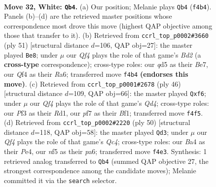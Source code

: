 \documentclass[11pt]{article}
\begin{document}
\clearpage

\begin{figure}[p]\centering
\begin{subfigure}{0.46\textwidth}\centering
\resizebox{\linewidth}{!}{%
\newchessgame
\chessboard[
  setfen={r1b5/ppp2ppk/7p/3qbn2/B4Q2/5P1P/PP4P1/R1B4K w - - 4 32},
  showmover=false,
  pgfstyle=straightmove, color=movearrow, markmove={f4-b4}
]}
\caption{}
\end{subfigure}\hfill
\begin{subfigure}{0.46\textwidth}\centering
\resizebox{\linewidth}{!}{%
\newchessgame
\chessboard[
  setfen={6k1/3bb1p1/r1q2p1p/Bp2p3/1P2N3/2PQ4/1P3PPP/3R2K1 b - - 3 26},
  showmover=false,
  pgfstyle=straightmove, color=movearrow, markmove={d7-e8}
]}
\caption{}
\end{subfigure}
\\[4pt]
\begin{subfigure}{0.46\textwidth}\centering
\resizebox{\linewidth}{!}{%
\newchessgame
\chessboard[
  setfen={r4bk1/1p3pp1/p1p2q1p/P7/1PbQ4/7P/2P2PP1/3R1BK1 w - - 0 24},
  showmover=false,
  pgfstyle=straightmove, color=movearrow, markmove={d4-f6}
]}
\caption{}
\end{subfigure}\hfill
\begin{subfigure}{0.46\textwidth}\centering
\resizebox{\linewidth}{!}{%
\newchessgame
\chessboard[
  setfen={2b2rk1/5p2/pN2pp2/2b1q3/2Q1P3/2P3P1/P4P2/1R3BK1 w - - 1 26},
  showmover=false,
  pgfstyle=straightmove, color=movearrow, markmove={c4-d3}
]}
\caption{}
\end{subfigure}
\caption{\textbf{Move 32, White: \texttt{Qb4}.} (a) Our position; Melanie plays \texttt{Qb4} (\texttt{f4b4}). Panels (b)--(d) are the retrieved master positions whose correspondence most drove this move (highest QAP objective among those that transfer to it). (b) Retrieved from \texttt{ccrl\_top\_p0002\#3660} (ply 51) [structural distance $d$=106, QAP obj=27]: the master played \texttt{Be8}; under $\mu$ our \emph{Qf4} plays the role of that game's \emph{Bd2} (a \textbf{cross-type} correspondence); cross-type roles: our \emph{q}d5 as their \emph{B}e7, our \emph{Q}f4 as their \emph{R}a6; transferred move \texttt{f4b4} \textbf{(endorses this move)}. (c) Retrieved from \texttt{ccrl\_top\_p0001\#2678} (ply 46) [structural distance $d$=109, QAP obj=66]: the master played \texttt{Qxf6}; under $\mu$ our \emph{Qf4} plays the role of that game's \emph{Qd4}; cross-type roles: our \emph{P}f3 as their \emph{R}d1, our \emph{p}f7 as their \emph{B}f1; transferred move \texttt{f4f5}. (d) Retrieved from \texttt{ccrl\_top\_p0002\#2220} (ply 50) [structural distance $d$=118, QAP obj=58]: the master played \texttt{Qd3}; under $\mu$ our \emph{Qf4} plays the role of that game's \emph{Qc4}; cross-type roles: our \emph{B}a4 as their \emph{P}e4, our \emph{n}f5 as their \emph{p}a6; transferred move \texttt{f4e3}. Synthesis: 1 retrieved analog transferred to \texttt{Qb4} (summed QAP objective 27, the strongest correspondence among the candidate moves); Melanie committed it via the \texttt{search} selector.}
\label{fig:thought-m62}
\end{figure}
\end{document}
